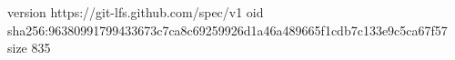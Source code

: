 version https://git-lfs.github.com/spec/v1
oid sha256:96380991799433673c7ca8c69259926d1a46a489665f1cdb7c133e9c5ca67f57
size 835
